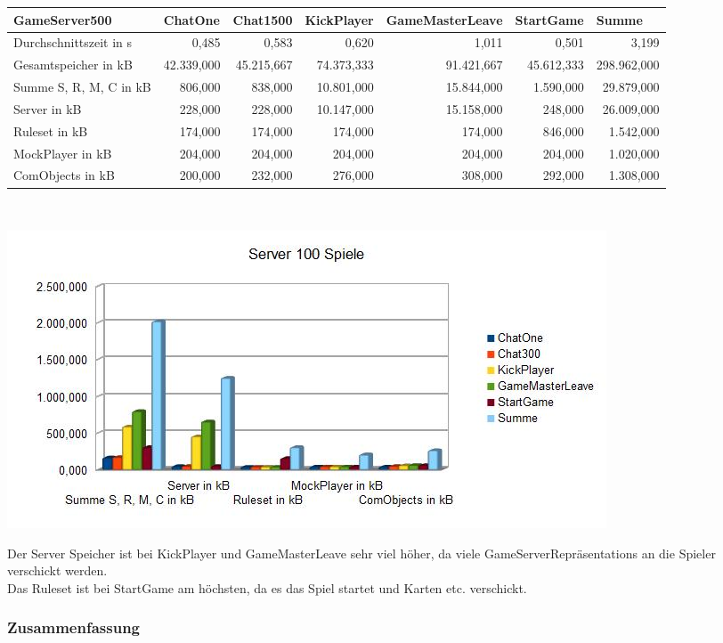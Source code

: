\documentclass[a4paper]{article}
\begin{document}
\noindent
\begin{tabular}{|l|r|r|r|r|r|r|}
\hline
GameServer500 & \multicolumn{1}{l|}{ChatOne} & \multicolumn{1}{l|}{Chat1500} & \multicolumn{1}{l|}{KickPlayer} & \multicolumn{1}{l|}{GameMasterLeave} & \multicolumn{1}{l|}{StartGame} & \multicolumn{1}{l|}{Summe} \\ \hline
Durchschnittszeit in s & 0,485 & 0,583 & 0,620 & 1,011 & 0,501 & 3,199 \\ \hline
Gesamtspeicher in kB & 42.339,000 & 45.215,667 & 74.373,333 & 91.421,667 & 45.612,333 & 298.962,000 \\ \hline
Summe S, R, M, C in kB & 806,000 & 838,000 & 10.801,000 & 15.844,000 & 1.590,000 & 29.879,000 \\ \hline
Server in kB & 228,000 & 228,000 & 10.147,000 & 15.158,000 & 248,000 & 26.009,000 \\ \hline
Ruleset in kB & 174,000 & 174,000 & 174,000 & 174,000 & 846,000 & 1.542,000 \\ \hline
MockPlayer in kB & 204,000 & 204,000 & 204,000 & 204,000 & 204,000 & 1.020,000 \\ \hline
ComObjects in kB & 200,000 & 232,000 & 276,000 & 308,000 & 292,000 & 1.308,000 \\ \hline
\end{tabular}
\ \\
\begin{center}
\includegraphics[scale=0.75]{6}
\end{center}
Der Server Speicher ist bei KickPlayer und GameMasterLeave sehr viel höher, da viele GameServerRepräsentations an die Spieler verschickt werden. \\
Das Ruleset ist bei StartGame am höchsten, da es das Spiel startet und Karten etc. verschickt.

\subsubsection{Zusammenfassung}
\end{document}
